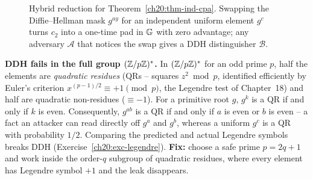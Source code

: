 \begin{figure}[htbp]
\centering
{}
\caption{Hybrid reduction for Theorem~\ref{ch20:thm-ind-cpa}. Swapping the Diffie--Hellman mask $g^{ay}$ for an independent uniform element $g^c$ turns $c_2$ into a one-time pad in $\mathbb{G}$ with zero advantage; any adversary $\mathcal{A}$ that notices the swap gives a DDH distinguisher $\mathcal{B}$.}
\label{ch20:fig-ind-cpa-hybrid}
\end{figure}

\begin{trapbox}
\textbf{DDH fails in the full group $(\mathbb{Z}/p\mathbb{Z})^{*}$.} In $(\mathbb{Z}/p\mathbb{Z})^{*}$ for an odd prime $p$, half the elements are \emph{quadratic residues} (QRs -- squares $z^2 \bmod p$, identified efficiently by Euler's criterion $x^{(p-1)/2} \equiv +1 \pmod p$, the Legendre test of Chapter~18) and half are quadratic non-residues ($\equiv -1$). For a primitive root $g$, $g^k$ is a QR if and only if $k$ is even. Consequently, $g^{ab}$ is a QR if and only if $a$ is even or $b$ is even -- a fact an attacker can read directly off $g^a$ and $g^b$, whereas a uniform $g^c$ is a QR with probability $1/2$. Comparing the predicted and actual Legendre symbols breaks DDH (Exercise~\ref{ch20:exc-legendre}). \textbf{Fix:} choose a safe prime $p = 2q + 1$ and work inside the order-$q$ subgroup of quadratic residues, where every element has Legendre symbol $+1$ and the leak disappears.
\end{trapbox}


